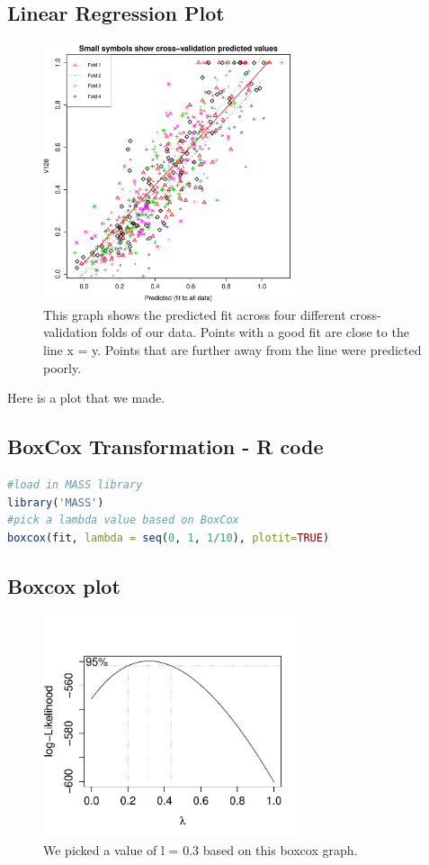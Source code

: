 \documentclass{article}
\begin{document}
\subsection{Linear Regression Plot}
\begin{figure}[H]
\centering
\includegraphics[width=3.0in]{part1a.pdf}
\caption{This graph shows the predicted fit across four different cross-validation folds of our data. Points with a good fit are close to the line x = y. Points that are further away from the line were predicted poorly.}\label{fig_container} 
\end{figure}

Here is a plot that we made.

\subsection{BoxCox Transformation - R code}
\begin{lstlisting}[language=r]
#load in MASS library
library('MASS')
#pick a lambda value based on BoxCox
boxcox(fit, lambda = seq(0, 1, 1/10), plotit=TRUE)
\end{lstlisting}

\subsection{Boxcox plot}
\begin{figure}[H]
\centering
\includegraphics[width=3.0in]{boxcox.pdf}
\caption{We picked a value of l = 0.3 based on this boxcox graph. }\label{fig_container} 
\end{figure}
\end{document}
